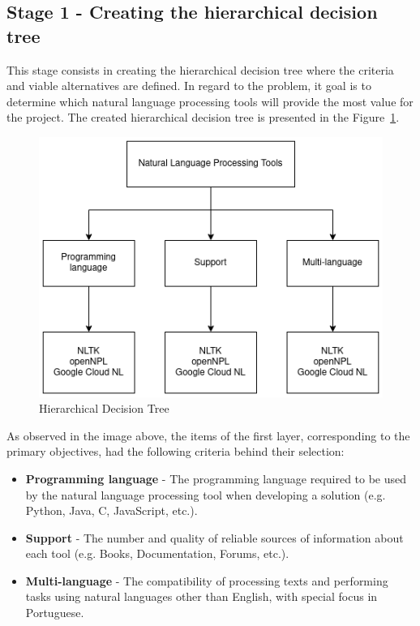 \subsection{Stage 1 - Creating the hierarchical decision tree}

This stage consists in creating the hierarchical decision tree where the criteria and viable alternatives are defined.
In regard to the problem, it goal is to determine which natural language processing tools will provide the most value for the project.
The created hierarchical decision tree is presented in the Figure~\ref{fig:AHP}.

\begin{figure}[H]
\centering
\includegraphics[scale=0.6]{ch3/assets/AHP.png}
\caption[Hierarchical Decision Tree]{Hierarchical Decision Tree}
\label{fig:AHP}
\end{figure}

As observed in the image above, the items of the first layer, corresponding to the primary objectives, had the following criteria behind their selection:
\begin{itemize}
    \item \textbf{Programming language} - The programming language required to be used by the natural language processing tool when developing a solution (e.g. Python, Java, C, JavaScript, etc.).
    \item \textbf{Support} - The number and quality of reliable sources of information about each tool (e.g. Books, Documentation, Forums, etc.).
    \item \textbf{Multi-language} - The compatibility of processing texts and performing tasks using natural languages other than English, with special focus in Portuguese.
\end{itemize}

